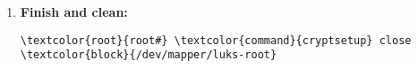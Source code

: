 \documentclass[10pt, a4paper, onecolumn, oneside, titlepage, openany]{book}
\begin{document}
\begin{enumerate}
\begin{enumerate}
\begin{Verbatim}[commandchars=\\\{\}]
\textcolor{root}{root#} \textcolor{command}{mkfs.btrfs} \textcolor{block}{/dev/mapper/luks-root}
\textcolor{root}{root#} \textcolor{command}{btrfs} filesystem label \textcolor{block}{/dev/mapper/luks-root}
LUKS-ROOT
\textcolor{root}{root#} \textcolor{command}{btrfstune} -U 00000000-0000-0000-0000-000000000003
\textcolor{block}{/dev/mapper/luks-root}
\textcolor{root}{>} y
\textcolor{root}{root#} \textcolor{command}{btrfs} check -p \textcolor{block}{/dev/mapper/luks-root} ; \textcolor{command}{echo} \$?
\end{Verbatim}
    \end{enumerate}
    \item \textbf{Finish and clean:}
\begin{Verbatim}[commandchars=\\\{\}]
\textcolor{root}{root#} \textcolor{command}{cryptsetup} close \textcolor{block}{/dev/mapper/luks-root}
\end{Verbatim}
\end{enumerate}
\end{document}
